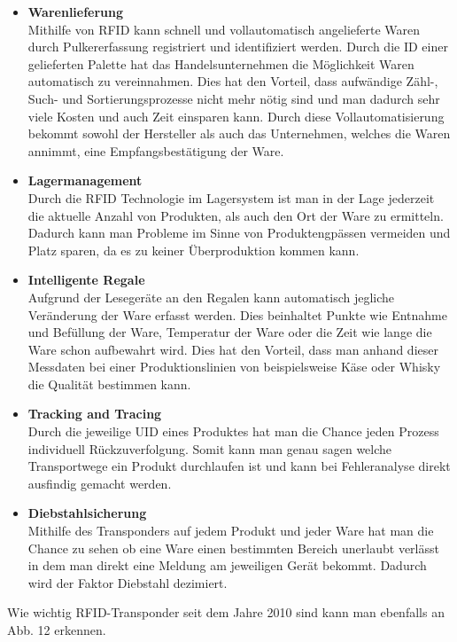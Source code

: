 \documentclass[a4paper,12pt]{scrartcl}
\begin{document}
\singlespacing
\begin{itemize}
\item \textbf{Warenlieferung}\\
Mithilfe von RFID kann schnell und vollautomatisch angelieferte Waren durch Pulkererfassung registriert und identifiziert werden. Durch die ID einer gelieferten Palette hat das Handelsunternehmen die Möglichkeit Waren automatisch zu vereinnahmen. Dies hat den Vorteil, dass aufwändige Zähl-, Such- und Sortierungsprozesse nicht mehr nötig sind und man dadurch sehr viele Kosten und auch Zeit einsparen kann. Durch diese Vollautomatisierung bekommt sowohl der Hersteller als auch das Unternehmen, welches die Waren annimmt, eine Empfangsbestätigung der Ware.
\item \textbf{Lagermanagement}\\
Durch die RFID Technologie im Lagersystem ist man in der Lage jederzeit die aktuelle Anzahl von Produkten, als auch den Ort der Ware zu ermitteln. Dadurch kann man Probleme im Sinne von Produktengpässen vermeiden und Platz sparen, da es zu keiner Überproduktion kommen kann.
\item \textbf{Intelligente Regale}\\
Aufgrund der Lesegeräte an den Regalen kann automatisch jegliche Veränderung der Ware erfasst werden. Dies beinhaltet Punkte wie Entnahme und Befüllung der Ware, Temperatur der Ware oder die Zeit wie lange die Ware schon aufbewahrt wird. Dies hat den Vorteil, dass man anhand dieser Messdaten bei einer Produktionslinien von beispielsweise Käse oder Whisky die Qualität bestimmen kann.
\item \textbf{Tracking and Tracing}\\
Durch die jeweilige UID eines Produktes hat man die Chance jeden Prozess individuell Rückzuverfolgung. Somit kann man genau sagen welche Transportwege ein Produkt durchlaufen ist und kann bei Fehleranalyse direkt ausfindig gemacht werden.
\item \textbf{Diebstahlsicherung}\\
Mithilfe des Transponders auf jedem Produkt und jeder Ware hat man die Chance zu sehen ob eine Ware einen bestimmten Bereich unerlaubt verlässt in dem man direkt eine Meldung am jeweiligen Gerät bekommt. Dadurch wird der Faktor Diebstahl dezimiert. 
\end{itemize}
\onehalfspacing

\newpage
Wie wichtig RFID-Transponder seit dem Jahre 2010 sind kann man ebenfalls an Abb. 12 erkennen.
\end{document}
